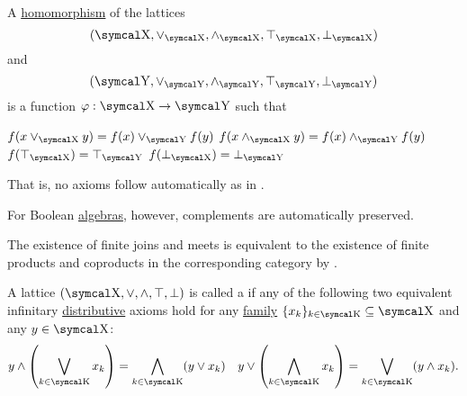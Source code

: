 \begin{proposition}\label{thm:lattice_homomorphism}
  A \hyperref[def:first_order_homomorphism]{homomorphism} of the lattices
  \begin{equation*}
    (\CX, \vee_{\CX}, \wedge_{\CX}, \top_{\CX}, \bot_{\CX})
  \end{equation*}
  and
  \begin{equation*}
    (\CY, \vee_{\CY}, \wedge_{\CY}, \top_{\CY}, \bot_{\CY})
  \end{equation*}
  is a function \( \varphi: \CX \to \CY \) such that
  \begin{PropEnum}
     \( f(x \vee_{\CX} y) = f(x) \vee_{\CY} f(y) \)
     \( f(x \wedge_{\CX} y) = f(x) \wedge_{\CY} f(y) \)
     \( f(\top_{\CX}) = \top_{\CY} \)
     \( f(\bot_{\CX}) = \bot_{\CY} \)
  \end{PropEnum}

  That is, no axioms follow automatically as in .

  For Boolean \hyperref[def:boolean_algebra]{algebras}, however, complements are automatically preserved.
\end{proposition}

\begin{remark}\label{def:lattice_categorical_product}
  The existence of finite joins and meets is equivalent to the existence of finite products and coproducts in the corresponding category by .
\end{remark}

\begin{definition}\label{def:distributive_lattice}
  A lattice \( (\CX, \vee, \wedge, \top, \bot) \) is called a  if any of the following two equivalent infinitary \hyperref[def:algebraic_theory/distributivity]{distributive} axioms hold for any \hyperref[def:indexed_family]{family} \( \{ x_k \}_{k \in \CK} \subseteq \CX \) and any \( y \in \CX \):
  \begin{align}\label{eq:def:distributive_lattice/distributivity}
    y \wedge \left( \bigvee_{k \in \CK} x_k \right) = \bigwedge_{k \in \CK} (y \vee x_k)
     &  &
    y \vee \left( \bigwedge_{k \in \CK} x_k \right) = \bigvee_{k \in \CK} (y \wedge x_k).
  \end{align}
\end{definition}

